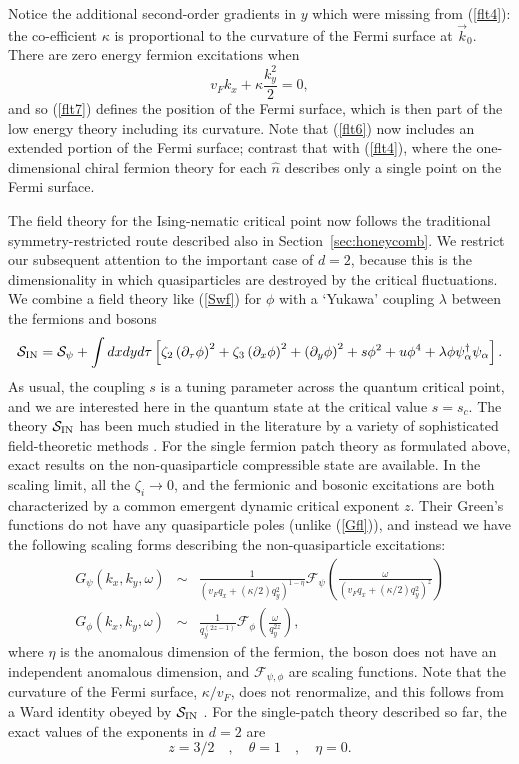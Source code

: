 \documentclass[10pt, oneside]{book}
\def\beq{\begin{equation}}
\def\eeq{\end{equation}}
\newcommand{\bea}{\begin{eqnarray}}
\newcommand{\eea}{\end{eqnarray}}
\begin{document}
\begin{doublespace}
Notice the additional second-order gradients in $y$ which were missing from (\ref{flt4}): the co-efficient $\kappa$
is proportional to the curvature of the Fermi surface at $\vec{k}_0$. There are zero energy fermion excitations when 
\begin{equation}
v_F k_x + \kappa \frac{k_y^2}{2} = 0, \label{flt7}
\end{equation}
and so (\ref{flt7}) defines the position
of the Fermi surface, which is then part of the low energy theory including its curvature. Note that (\ref{flt6})
now includes an extended portion of the Fermi surface; contrast that with (\ref{flt4}), where  
the one-dimensional chiral fermion theory for each $\hat{n}$ describes only a single point on the Fermi surface.

The field theory for the Ising-nematic critical point now follows the traditional symmetry-restricted route described also in 
Section~\ref{sec:honeycomb}. We restrict our subsequent attention to the important case of $d=2$, because this is the dimensionality in which quasiparticles are destroyed by the critical fluctuations. We combine a field theory like (\ref{Swf}) for $\phi$ with a `Yukawa' coupling $\lambda$ between the fermions and bosons 
\beq
\mathcal{S}_{\rm IN} = \mathcal{S}_\psi + \int dx dy d\tau \left[\zeta_2 \left( \partial_\tau \phi \right)^2
+ \zeta_3 \left( \partial_x \phi \right)^2 + \left(\partial_y \phi \right)^2 + s \phi^2 + u \phi^4 + \lambda \phi \psi_{\alpha}^\dagger \psi_{\alpha} \right].
\label{inaction}
\eeq
As usual, the coupling $s$ is a tuning parameter across the quantum critical point, and we are interested here in the 
quantum state at the critical value $s=s_c$.
The theory $\mathcal{S}_{\rm IN}$ has been much studied in the literature by a variety of sophisticated field-theoretic 
methods \cite{sungsik1,metlitski1,mross,sungsik2}. 
For the single fermion patch theory as formulated above, exact results on the non-quasiparticle compressible state are available.
In the scaling limit, all the $\zeta_i \rightarrow 0$, and the fermionic and bosonic excitations are both characterized by
a common emergent dynamic critical exponent $z$. Their Green's functions do not have any quasiparticle poles (unlike (\ref{Gfl})), and instead we have the following scaling forms describing the non-quasiparticle excitations:
\bea
G_\psi (k_x, k_y, \omega) &\sim& \frac{1}{(v_F q_x + (\kappa/2) q_y^2)^{1-\eta}} 
\mathcal{F}_\psi \left( \frac{\omega}{(v_F q_x + (\kappa/2) q_y^2)^z} \right) \nonumber \\
G_\phi (k_x, k_y, \omega) &\sim& \frac{1}{q_y^{(2z-1)}} \mathcal{F}_\phi \left( \frac{\omega}{ q_y^{2z}} \right),
\eea
where $\eta$ is the anomalous dimension of the fermion, the boson does not have an independent anomalous dimension,
and $\mathcal{F}_{\psi,\phi}$ are scaling functions. Note that the curvature of the Fermi surface, $\kappa/v_F$, does
not renormalize, and this follows from a Ward identity obeyed by $\mathcal{S}_{\rm IN}$ \cite{metlitski1}. 
For the single-patch theory
described so far, the exact values of the exponents in $d=2$ are \cite{sungsik3}
\beq
z = 3/2 \quad , \quad \theta = 1 \quad , \quad \eta = 0.
\eeq


\end{doublespace}
\end{document}
